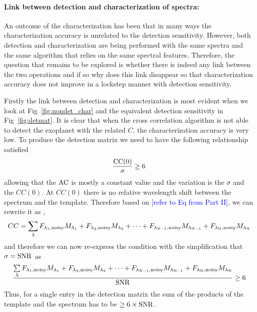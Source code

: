 \paragraph{Link between detection and characterization of spectra:\\}
An outcome of the characterization has been that in many ways the characterization accuracy is unrelated to the detection sensitivity.
However, both detection and characterization are being performed with the same spectra and the same algorithm that relies on the same spectral features.
Therefore, the question that remains to be explored is whether there is indeed any link between the two operations and if so why does this link disappear so that characterization accuracy does not improve in a lockstep manner with detection sensitivity.

Firstly the link between detection and characterization is most evident when we look at Fig~\ref{fig:nondet_char} and the equivalent detection sensitivity in Fig~\ref{fig:detmat}.
It is clear that when the cross correlation algorithm is not able to detect the exoplanet with the related $C$, the characterization accuracy is very low.
To produce the detection matrix we need to have the following relationship satisfied
\begin{equation}
    \dfrac{\rm{CC(0)}}{\sigma}\ge6
\end{equation}
allowing that the $\rm{AC}$ is mostly a constant value and the variation is the $\sigma$ and the $CC(0)$.
At $CC(0)$ there is no relative wavelength shift between the spectrum and the template.
Therefore based on \textcolor{blue}{[refer to Eq from Part II]}, we can rewrite it as ,
\begin{equation}
    CC = \sum\limits_{\lambda} F_{\rm{\lambda_{1},noisy}}M_{\lambda_1}+ F_{\rm{\lambda_{2},noisy}}M_{\lambda_2}+\cdots+F_{\rm{\lambda_{N-1},noisy}}M_{\lambda_{\rm{N-1}}}+F_{\rm{\lambda_{N},noisy}}M_{\lambda_{\rm{N}}}
    \label{eq:CC(0)expansion}
\end{equation}
and therefore we can now re-express the condition with the simplification that $\sigma = \rm{SNR}$ as 
\begin{equation}
    \dfrac{\sum\limits_{\lambda} F_{\rm{\lambda_{1},noisy}}M_{\lambda_1}+ F_{\rm{\lambda_{2},noisy}}M_{\lambda_2}+\cdots+F_{\rm{\lambda_{N-1},noisy}}M_{\lambda_{\rm{N-1}}}+F_{\rm{\lambda_{N},noisy}}M_{\lambda_{\rm{N}}}}{\rm{SNR}}\ge 6
\end{equation}
Thus, for a single entry in the detection matrix the sum of the products of the template and the spectrum has to be $\ge 6\times \rm{SNR}$.
